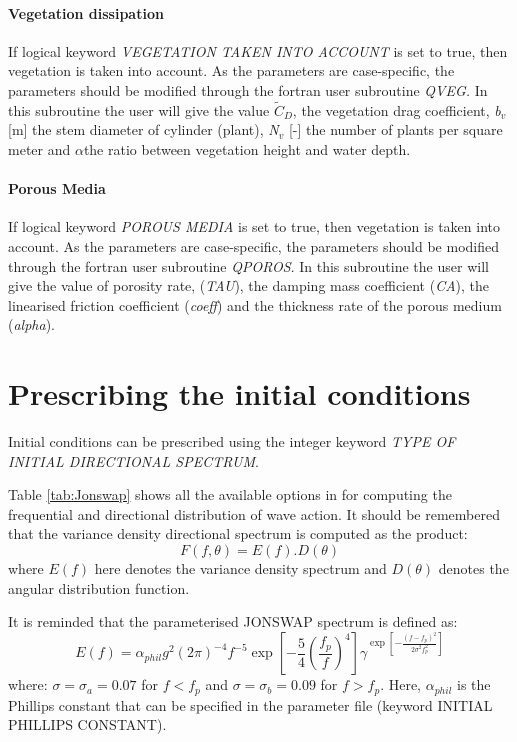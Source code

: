 \paragraph{ Vegetation dissipation}

 If logical keyword \textit{VEGETATION TAKEN INTO ACCOUNT} is set to true, then vegetation is taken into account. As the parameters are case-specific, the parameters should be modified through the fortran user subroutine \textit{QVEG. }In this subroutine the user will give the value $\tilde{C}_{D} $, the vegetation drag coefficient, \textit{b${}_{v}$} [m] the stem diameter of cylinder (plant), \textit{N${}_{v}$} [-] the number of plants per square meter and $\alpha $the ratio between vegetation height and water depth.

\paragraph{Porous Media}

If logical keyword \textit{POROUS MEDIA} is set to true, then vegetation is taken into account. As the parameters are case-specific, the parameters should be modified through the fortran user subroutine \textit{QPOROS}. In this subroutine the user will give the value of porosity rate, (\textit{TAU}), the damping mass coefficient (\textit{CA}),  the linearised friction coefficient (\textit{coeff}) and the thickness rate of the porous medium (\textit{alpha}).

 \section{ Prescribing the initial conditions}
\label{se:initcond}
 Initial conditions can be prescribed using the integer keyword \textit{TYPE OF INITIAL DIRECTIONAL SPECTRUM}.

Table \ref{tab:Jonswap} shows all the available options in \tomawac for computing the frequential and directional distribution of wave action. It should be remembered that the variance density directional spectrum is computed as the product:
\[F(f,\theta )=E(f).D(\theta )\]
where $E(f)$ here denotes the variance density spectrum and $D\left(\theta \right)$ denotes the angular distribution function.

 It is reminded that the parameterised JONSWAP spectrum is defined as:
\[E(f)=\alpha _{phil} g^{2} (2\pi )^{-4} f^{-5} \exp \left[-\frac{5}{4} \left(\frac{f_{p}^{} }{f^{} } \right)^{4} \right]\gamma ^{\exp \left[-\frac{\left(f-f_{p} \right)^{2} }{2\sigma ^{2} f_{p}^{2} } \right]} \]
where:  $\sigma =\sigma_{a} =0.07$ for  $f< f_{p}$  and  $\sigma =\sigma_{b} =0.09$ for  $f> f_{p}$. Here, $\alpha_{phil}$  is the Phillips constant that can be specified in the parameter file (keyword INITIAL PHILLIPS CONSTANT).


